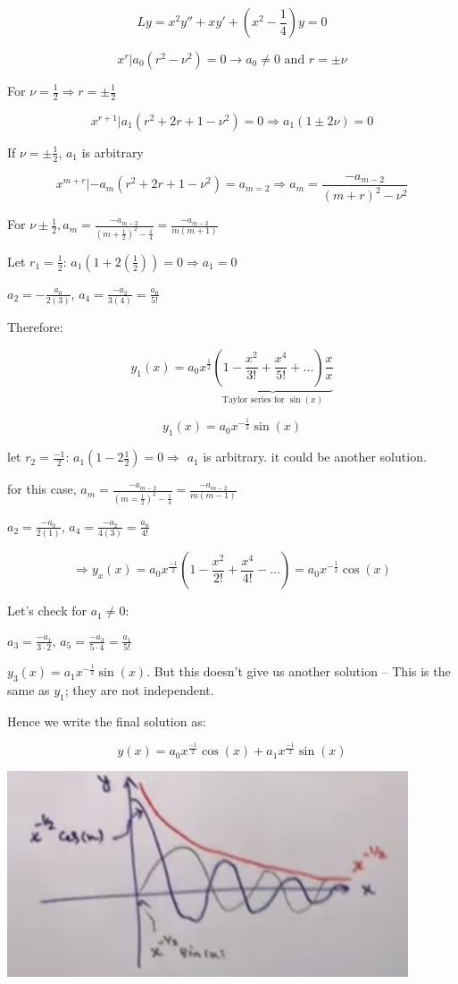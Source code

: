 \documentclass{article}
\begin{document}
$$Ly = x^2 y'' + xy' + (x^2 - \frac{1}{4} )y = 0$$

$$x^r | a_0 (r^2 - \nu^2) = 0 \longrightarrow a_0 \neq 0 \text{ and } r = \pm \nu$$

For $\nu = \frac{1}{2} \Rightarrow r = \pm \frac{1}{2}$

$$x^{r+1} | a_1 (r^2 + 2r + 1 - \nu^2) = 0 \Rightarrow a_1 (1 \pm 2 \nu) = 0$$

If $\nu = \pm \frac{1}{2}$, $a_1$ is arbitrary

$$x^{m+r} | -a_m (r^2 + 2r + 1 - \nu^2) = a_{m=2} \Rightarrow a_m = \frac{-a_{m-2}}{(m+r)^2 - \nu^2}$$

For $\nu \pm \frac{1}{2}, a_m = \frac{-a_{m-2}}{(m+\frac{1}{2})^2 - \frac{1}{4}} = \frac{-a_{m-2}}{m(m+1)}$

Let $r_1 = \frac{1}{2}$: $a_1 (1 + 2 (\frac{1}{2})) = 0 \Rightarrow a_1 = 0$

$a_2 = - \frac{a_0}{2(3)}$, $a_4 = \frac{-a_2}{3(4)} = \frac{a_0}{5!}$

Therefore:

$$y_1 (x) = a_0 x^{\frac{1}{2}} \underbrace{\left(1 - \frac{x^2}{3!} + \frac{x^4}{5!} + ... \right) \frac{x}{x}}_{\text{Taylor series for } \sin(x)}$$

$$y_1(x) = a_0 x^{- \frac{1}{2}} \sin(x)$$

let $r_2 = \frac{-1}{2}$: $a_1 (1 - 2 \frac{1}{2}) = 0 \Rightarrow$ $a_1$ is arbitrary. it could be another solution.


for this case, $a_m = \frac{-a_{m - 2}}{(m = \frac{1}{2})^2 - \frac{1}{4}} = \frac{-a_{m - 2}}{m(m-1)}$

$a_2 = \frac{-a_0}{2(1)}$, $a_4 = \frac{-a_2}{4(3)} = \frac{a_0}{4!}$

$$\Rightarrow y_x(x) = a_0 x^{\frac{-1}{2}} \left(1 - \frac{x^2}{2!} + \frac{x^4}{4!} - ... \right) = a_0 x^{- \frac{1}{2}} \cos(x)$$

Let's check for $a_1 \neq 0$:

$a_3 = \frac{-a_1}{3 \cdot 2}$, $a_5 = \frac{-a_3}{5 \cdot 4} = \frac{a_1}{5!}$

$y_3 (x) = a_1 x^{- \frac{1}{2}} \sin(x)$. But this doesn't give us another solution -- This is the same as $y_1$; they are not independent. 

Hence we write the final solution as:

$$y(x) = a_0 x^{\frac{-1}{2}} \cos(x) + a_1 x^{\frac{-1}{2}} \sin(x)$$

\includegraphics[width = 0.9 \textwidth]{image5.png}
\end{document}
